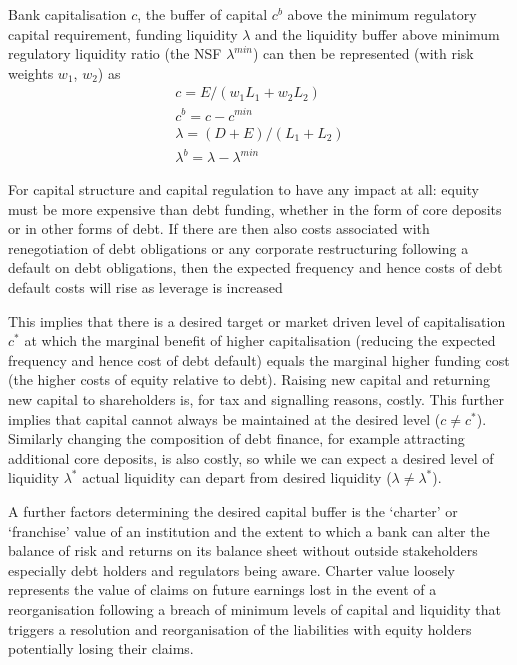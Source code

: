 \documentclass[
  12,
]{article}
\begin{document}
Bank capitalisation \(c\), the buffer of capital \(c^b\) above the minimum regulatory capital requirement, funding liquidity \(\lambda\) and the liquidity buffer above minimum regulatory liquidity ratio (the NSF \(\lambda^{min}\)) can then be represented (with risk weights \(w_1\), \(w_2\)) as
\[
\begin{split}
c=E/(w_1 L_1+ w_2 L_2)\\
c^b =c-c^{min}\\
\lambda =(D+E)/(L_1+L_2)\\
\lambda^{b}=\lambda-\lambda^{min}
\end{split}
\]

For capital structure and capital regulation to have any impact at all: equity must be more expensive than debt funding, whether in the form of core deposits or in other forms of debt. If there are then also costs associated with renegotiation of debt obligations or any corporate restructuring following a default on debt obligations, then the expected frequency and hence costs of debt default costs will rise as leverage is increased

This implies that there is a desired target or market driven level of capitalisation \(c^\ast\) at which the marginal benefit of higher capitalisation (reducing the expected frequency and hence cost of debt default) equals the marginal higher funding cost (the higher costs of equity relative to debt). Raising new capital and returning new capital to shareholders is, for tax and signalling reasons, costly. This further implies that capital cannot always be maintained at the desired level (\(c \neq c^\ast\)). Similarly changing the composition of debt finance, for example attracting additional core deposits, is also costly, so while we can expect a desired level of liquidity \(\lambda^\ast\) actual liquidity can depart from desired liquidity (\(\lambda \neq \lambda^\ast\)).

A further factors determining the desired capital buffer is the `charter' or `franchise' value of an institution and the extent to which a bank can alter the balance of risk and returns on its balance sheet without outside stakeholders especially debt holders and regulators being aware. Charter value loosely represents the value of claims on future earnings lost in the event of a reorganisation following a breach of minimum levels of capital and liquidity that triggers a resolution and reorganisation of the liabilities with equity holders potentially losing their claims.
\end{document}
